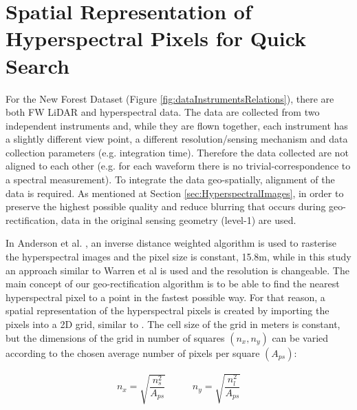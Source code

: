 \documentclass{subfiles}
\begin{document}
	
	
	

	


	
\section{Spatial Representation of Hyperspectral Pixels for Quick Search}\label{sec:SpatialRepresentation}


	\par For the New Forest Dataset (Figure \ref{fig:dataInstrumentsRelations}), there are both FW LiDAR and hyperspectral data. {\color{blue} The data are collected from two independent instruments and, while they are flown together, each instrument has a slightly different view point, a different resolution/sensing mechanism and data collection parameters (e.g. integration time).  Therefore the data collected are not aligned to each other (e.g. for each waveform there is no trivial-correspondence to a spectral measurement).} To integrate the data geo-spatially, alignment of the data is required.  As mentioned at Section \ref{sec:HyperspectralImages}, in order to preserve the highest possible quality and reduce blurring that occurs during geo-rectification, data in the original sensing geometry (level-1) are used.
	
	\par In Anderson et al. \cite{Anderson2008}, an inverse distance weighted algorithm is used to rasterise the hyperspectral images and the pixel size is constant, 15.8m, while in this study an approach similar to Warren et al \cite{Warren2014} is used and the resolution is changeable. The main concept of our geo-rectification algorithm is to be able to find the nearest hyperspectral pixel to a point in the fastest possible way. For that reason, a spatial representation of the hyperspectral pixels is created by importing the pixels into a 2D grid, similar to \cite{Warren2014}. The cell size of the grid in meters is constant, but the dimensions of the grid in number of squares $(n_x, n_y)$ can be varied according to the chosen average number of pixels per square $(A_{ps})$: 
	
	\begin{eqnarray}
		n_x=\sqrt{\dfrac{n_s^2}{A_{ps}}} \;\;\;\;\;\;\;\;\;\; n_y=\sqrt{\dfrac{n_l^2}{A_{ps}}}   
	\end{eqnarray} 
	
\end{document}
